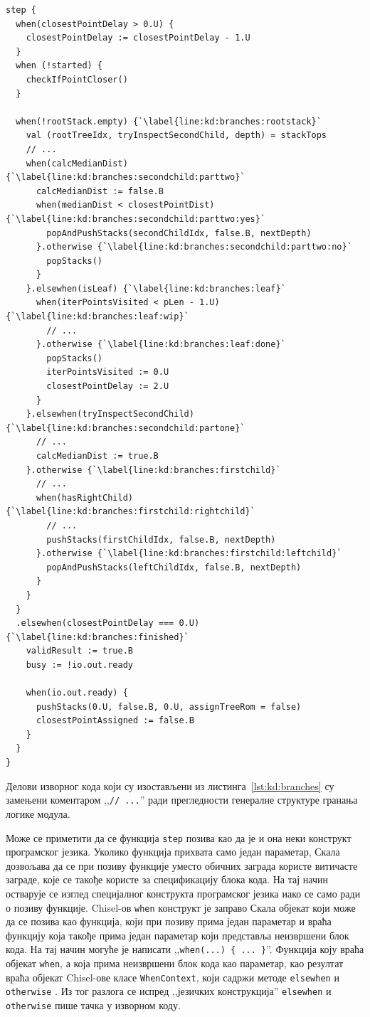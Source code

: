 \documentclass[master]{finthesis}
\newcommand*{\prog}[1]{\texttt{#1}}
\newcommand*{\func}[1]{\prog{#1}}
\begin{document}
\begin{lstlisting}[style=Chisel, caption={Структура гранања у позиву функције \func{step}.}, label={lst:kd:branches}]
step {
  when(closestPointDelay > 0.U) {
    closestPointDelay := closestPointDelay - 1.U
  }
  when (!started) {
    checkIfPointCloser()
  }

  when(!rootStack.empty) {`\label{line:kd:branches:rootstack}`
    val (rootTreeIdx, tryInspectSecondChild, depth) = stackTops
    // ...
    when(calcMedianDist) {`\label{line:kd:branches:secondchild:parttwo}`
      calcMedianDist := false.B
      when(medianDist < closestPointDist) {`\label{line:kd:branches:secondchild:parttwo:yes}`
        popAndPushStacks(secondChildIdx, false.B, nextDepth)
      }.otherwise {`\label{line:kd:branches:secondchild:parttwo:no}`
        popStacks()
      }
    }.elsewhen(isLeaf) {`\label{line:kd:branches:leaf}`
      when(iterPointsVisited < pLen - 1.U) {`\label{line:kd:branches:leaf:wip}`
        // ...
      }.otherwise {`\label{line:kd:branches:leaf:done}`
        popStacks()
        iterPointsVisited := 0.U
        closestPointDelay := 2.U
      }
    }.elsewhen(tryInspectSecondChild) {`\label{line:kd:branches:secondchild:partone}`
      // ...
      calcMedianDist := true.B
    }.otherwise {`\label{line:kd:branches:firstchild}`
      // ...
      when(hasRightChild) {`\label{line:kd:branches:firstchild:rightchild}`
        // ...
        pushStacks(firstChildIdx, false.B, nextDepth)
      }.otherwise {`\label{line:kd:branches:firstchild:leftchild}`
        popAndPushStacks(leftChildIdx, false.B, nextDepth)
      }
    }
  }
  .elsewhen(closestPointDelay === 0.U) {`\label{line:kd:branches:finished}`
    validResult := true.B
    busy := !io.out.ready

    when(io.out.ready) {
      pushStacks(0.U, false.B, 0.U, assignTreeRom = false)
      closestPointAssigned := false.B
    }
  }
}
\end{lstlisting}

Делови изворног кода који су изостављени из листинга~\ref{lst:kd:branches} су замењени коментаром ,,\prog{// ...}'' ради прегледности генералне структуре гранања логике модула.

Може се приметити да се функција \func{step} позива као да је и она неки конструкт програмског језика. Уколико функција прихвата само један параметар, Скала дозвољава да се при позиву функције уместо обичних заграда користе витичасте заграде, које се такође користе за спецификацију блока кода. На тај начин остварује се изглед специјалног конструкта програмског језика иако се само ради о позиву функције. Chisel-ов \prog{when} конструкт је заправо Скала објекат који може да се позива као функција, који при позиву прима један параметар и враћа функцију која такође прима један параметар који представља неизвршени блок кода. На тај начин могуће је написати ,,\prog{when(...) \{ ... \}}''. Функција коју враћа објекат \prog{when}, а која прима неизвршени блок кода као параметар, као резултат враћа објекат Chisel-ове класе \prog{WhenContext}, који садржи методе \prog{elsewhen} и \prog{otherwise} \cite{whenimplementation}. Из тог разлога се испред ,,језичких конструкција'' \prog{elsewhen} и \prog{otherwise} пише тачка у изворном коду.
\end{document}
